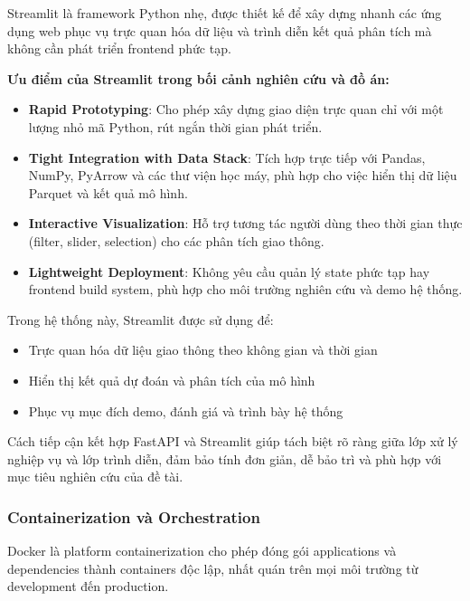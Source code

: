 
Streamlit là framework Python nhẹ, được thiết kế để xây dựng nhanh các ứng dụng web phục vụ trực quan hóa dữ liệu và trình diễn kết quả phân tích mà không cần phát triển frontend phức tạp.

\textbf{Ưu điểm của Streamlit trong bối cảnh nghiên cứu và đồ án:}

\begin{itemize}
    \item \textbf{Rapid Prototyping}: Cho phép xây dựng giao diện trực quan chỉ với một lượng nhỏ mã Python, rút ngắn thời gian phát triển.
    
    \item \textbf{Tight Integration with Data Stack}: Tích hợp trực tiếp với Pandas, NumPy, PyArrow và các thư viện học máy, phù hợp cho việc hiển thị dữ liệu Parquet và kết quả mô hình.
    
    \item \textbf{Interactive Visualization}: Hỗ trợ tương tác người dùng theo thời gian thực (filter, slider, selection) cho các phân tích giao thông.
    
    \item \textbf{Lightweight Deployment}: Không yêu cầu quản lý state phức tạp hay frontend build system, phù hợp cho môi trường nghiên cứu và demo hệ thống.
\end{itemize}

Trong hệ thống này, Streamlit được sử dụng để:
\begin{itemize}
    \item Trực quan hóa dữ liệu giao thông theo không gian và thời gian
    \item Hiển thị kết quả dự đoán và phân tích của mô hình
    \item Phục vụ mục đích demo, đánh giá và trình bày hệ thống
\end{itemize}

Cách tiếp cận kết hợp FastAPI và Streamlit giúp tách biệt rõ ràng giữa lớp xử lý nghiệp vụ và lớp trình diễn, đảm bảo tính đơn giản, dễ bảo trì và phù hợp với mục tiêu nghiên cứu của đề tài.

\subsubsection{Containerization và Orchestration}


Docker là platform containerization cho phép đóng gói applications và dependencies thành containers độc lập, nhất quán trên mọi môi trường từ development đến production.

